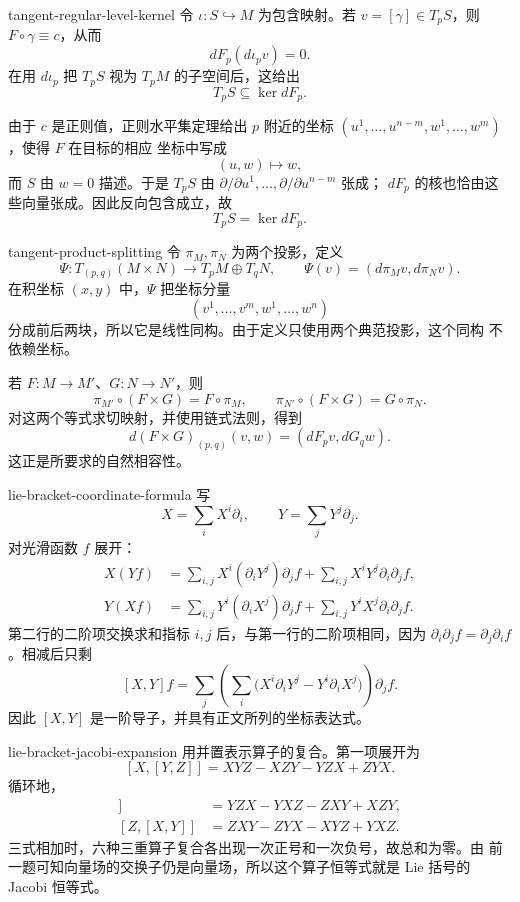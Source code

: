 \begin{solution}{tangent-regular-level-kernel}
令 \(\iota:S\hookrightarrow M\) 为包含映射。若
\(v=[\gamma]\in T_pS\)，则 \(F\circ\gamma\equiv c\)，从而
\[
 dF_p(d\iota_pv)=0.
\]
在用 \(d\iota_p\) 把 \(T_pS\) 视为 \(T_pM\) 的子空间后，这给出
\[
 T_pS\subseteq\ker dF_p.
\]

由于 \(c\) 是正则值，正则水平集定理给出 \(p\) 附近的坐标
\((u^1,\ldots,u^{n-m},w^1,\ldots,w^m)\)，使得 \(F\) 在目标的相应
坐标中写成
\[
 (u,w)\longmapsto w,
\]
而 \(S\) 由 \(w=0\) 描述。于是 \(T_pS\) 由
\(\partial/\partial u^1,\ldots,\partial/\partial u^{n-m}\) 张成；
\(dF_p\) 的核也恰由这些向量张成。因此反向包含成立，故
\[
 T_pS=\ker dF_p.
\]
\end{solution}

\begin{solution}{tangent-product-splitting}
令 \(\pi_M,\pi_N\) 为两个投影，定义
\[
 \Psi:T_{(p,q)}(M\times N)\longrightarrow T_pM\oplus T_qN,
 \qquad
 \Psi(v)=(d\pi_Mv,d\pi_Nv).
\]
在积坐标 \((x,y)\) 中，\(\Psi\) 把坐标分量
\[
 (v^1,\ldots,v^m,w^1,\ldots,w^n)
\]
分成前后两块，所以它是线性同构。由于定义只使用两个典范投影，这个同构
不依赖坐标。

若 \(F:M\to M'\)、\(G:N\to N'\)，则
\[
 \pi_{M'}\circ(F\times G)=F\circ\pi_M,\qquad
 \pi_{N'}\circ(F\times G)=G\circ\pi_N.
\]
对这两个等式求切映射，并使用链式法则，得到
\[
 d(F\times G)_{(p,q)}(v,w)=(dF_pv,dG_qw).
\]
这正是所要求的自然相容性。
\end{solution}

\begin{solution}{lie-bracket-coordinate-formula}
写
\[
 X=\sum_iX^i\partial_i,\qquad
 Y=\sum_jY^j\partial_j.
\]
对光滑函数 \(f\) 展开：
\begin{align*}
 X(Yf)
 &=\sum_{i,j}X^i(\partial_iY^j)\partial_jf
   +\sum_{i,j}X^iY^j\partial_i\partial_jf,\\
 Y(Xf)
 &=\sum_{i,j}Y^i(\partial_iX^j)\partial_jf
   +\sum_{i,j}Y^iX^j\partial_i\partial_jf.
\end{align*}
第二行的二阶项交换求和指标 \(i,j\) 后，与第一行的二阶项相同，因为
\(\partial_i\partial_jf=\partial_j\partial_if\)。相减后只剩
\[
 [X,Y]f
 =\sum_j\left(\sum_i
   \bigl(X^i\partial_iY^j-Y^i\partial_iX^j\bigr)\right)\partial_jf.
\]
因此 \([X,Y]\) 是一阶导子，并具有正文所列的坐标表达式。
\end{solution}

\begin{solution}{lie-bracket-jacobi-expansion}
用并置表示算子的复合。第一项展开为
\[
 [X,[Y,Z]]=XYZ-XZY-YZX+ZYX.
\]
循环地，
\begin{align*}
 [Y,[Z,X]]&=YZX-YXZ-ZXY+XZY,\\
 [Z,[X,Y]]&=ZXY-ZYX-XYZ+YXZ.
\end{align*}
三式相加时，六种三重算子复合各出现一次正号和一次负号，故总和为零。由
前一题可知向量场的交换子仍是向量场，所以这个算子恒等式就是 Lie 括号的
Jacobi 恒等式。
\end{solution}


